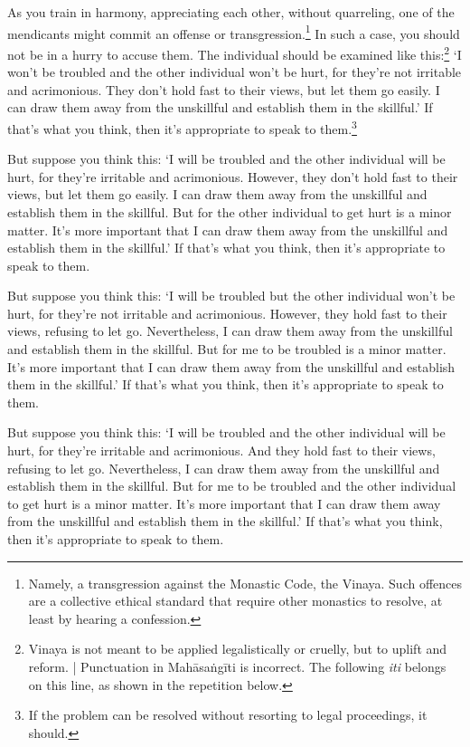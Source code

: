 \documentclass[12pt,openany]{book}%
\begin{document}
As you train in harmony, appreciating each other, without quarreling, one of the mendicants might commit an offense or transgression.\footnote{Namely, a  transgression against the Monastic Code, the Vinaya. Such offences are a collective ethical standard that require other monastics to resolve, at least by hearing a confession. } In such a case, you should not be in a hurry to accuse them. The individual should be examined like this:\footnote{Vinaya is not meant to be applied legalistically or cruelly, but to uplift and reform. | Punctuation in \textsanskrit{Mahāsaṅgīti} is incorrect. The following \textit{iti} belongs on this line, as shown in the repetition below. } ‘I won’t be troubled and the other individual won’t be hurt, for they’re not irritable and acrimonious. They don’t hold fast to their views, but let them go easily. I can draw them away from the unskillful and establish them in the skillful.’ If that’s what you think, then it’s appropriate to speak to them.\footnote{If the problem can be resolved without resorting to legal proceedings, it should. } 

But suppose you think this: ‘I will be troubled and the other individual will be hurt, for they’re irritable and acrimonious. However, they don’t hold fast to their views, but let them go easily. I can draw them away from the unskillful and establish them in the skillful. But for the other individual to get hurt is a minor matter. It’s more important that I can draw them away from the unskillful and establish them in the skillful.’ If that’s what you think, then it’s appropriate to speak to them. 

But suppose you think this: ‘I will be troubled but the other individual won’t be hurt, for they’re not irritable and acrimonious. However, they hold fast to their views, refusing to let go. Nevertheless, I can draw them away from the unskillful and establish them in the skillful. But for me to be troubled is a minor matter. It’s more important that I can draw them away from the unskillful and establish them in the skillful.’ If that’s what you think, then it’s appropriate to speak to them. 

But suppose you think this: ‘I will be troubled and the other individual will be hurt, for they’re irritable and acrimonious. And they hold fast to their views, refusing to let go. Nevertheless, I can draw them away from the unskillful and establish them in the skillful. But for me to be troubled and the other individual to get hurt is a minor matter. It’s more important that I can draw them away from the unskillful and establish them in the skillful.’ If that’s what you think, then it’s appropriate to speak to them. 
\end{document}
